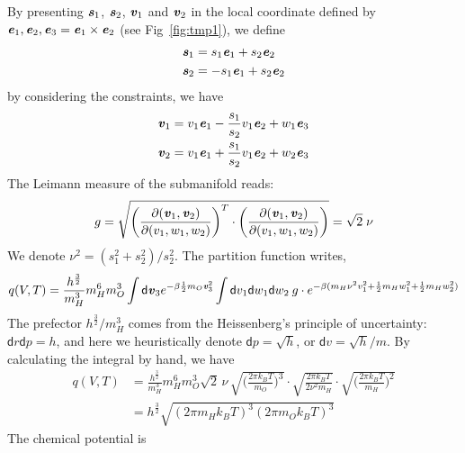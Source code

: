 \documentclass[aip,jcp,a4paper,reprint,onecolumn]{revtex4-1}
\newcommand{\vect}[1]{\textbf{\textit{#1}}}
\newcommand{\dd}[0]{\textsf{d}}
\begin{document}
By presenting $\vect s_1$, $\vect s_2$,
$\vect v_1$ and $\vect v_2$ in the local coordinate
defined by $\vect e_1, \vect e_2, \vect e_3 = \vect e_1\times\vect e_2$
(see Fig~\ref{fig:tmp1}), we define
\begin{align}
\vect s_1 &= s_1\vect e_1 + s_2\vect e_2  \\
\vect s_2 &= -s_1\vect e_1 + s_2\vect e_2    
\end{align}
by considering the constraints, we have
\begin{align}
\vect v_1 &= v_1\vect e_1 - \frac{s_1}{s_2}v_1\vect e_2 + w_1\vect e_3\\
\vect v_2 &= v_1\vect e_1 + \frac{s_1}{s_2}v_1\vect e_2 + w_2\vect e_3
\end{align}
The Leimann measure of the submanifold reads:
\begin{align}
  g = \sqrt{
    \bigg(
    \frac{\partial(\vect v_1, \vect v_2)}
    {\partial(v_1,w_1,w_2)}
    \bigg)^T
    \cdot
    \bigg(
    \frac{\partial(\vect v_1, \vect v_2)}
    {\partial(v_1,w_1,w_2)}
    \bigg)
  }
  = \sqrt 2 \;\nu
\end{align}
We denote $\nu^2 = (s_1^2 + s_2^2) / s_2^2$.
The partition function writes,
\begin{align}
  q(V,T) =
  \frac{h^\frac32}{m_H^3}
  m_H^6 m_O^3
  \int \dd\vect v_3
  e^{-\beta \frac12m_O\vect v_3^2}
  \int \dd v_1\dd w_1\dd w_2\:g\cdot
  e^{-\beta (m_H\nu^2 v_1^2 + \frac12m_H w_1^2 + \frac12m_H w_2^2)}
\end{align}
The prefector ${h^\frac32}/{m_H^3}$ comes from the Heissenberg's principle
of uncertainty: $\dd r\dd p = h$, and here we
heuristically denote $\dd p = \sqrt h$, or
$\dd v  = \sqrt h/m$.
By calculating the integral by hand, we have 
\begin{align}
  q(V,T) &=
  \frac{h^\frac32}{m_H^3}
  m_H^6 m_O^3
  \sqrt 2\,\nu\,
  \sqrt{
    \bigg(
    \frac{2\pi k_BT}{m_O}
    \bigg)^3
  }
  \cdot
  \sqrt{
    \frac{2\pi k_BT}{2\nu^2m_H}
  }
  \cdot
  \sqrt{
    \bigg(
    \frac{2\pi k_BT}{m_H}
    \bigg)^2
  }\\
  &=
  {h^\frac32}
  \sqrt{
    (2\pi m_Hk_BT)^3
    (2\pi m_Ok_BT)^3
  }
\end{align}
The chemical potential is
\end{document}
